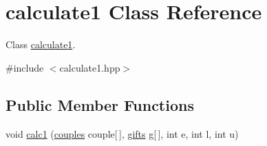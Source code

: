 \hypertarget{classcalculate1}{\section{calculate1 Class Reference}
\label{classcalculate1}
}


Class \hyperlink{classcalculate1}{calculate1}.  




{\ttfamily \#include $<$calculate1.\-hpp$>$}

\subsection*{Public Member Functions}
\begin{DoxyCompactItemize}
\item 
void \hyperlink{classcalculate1_a75ebc17b59d2333ded831a47281b8fd3}{calc1} (\hyperlink{classcouples}{couples} couple\mbox{[}$\,$\mbox{]}, \hyperlink{classgifts}{gifts} g\mbox{[}$\,$\mbox{]}, int e, int l, int u)
\end{DoxyCompactItemize}
